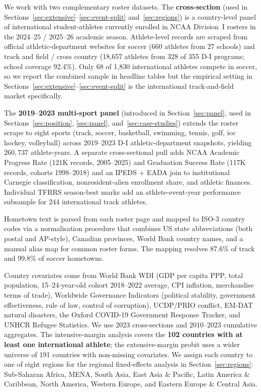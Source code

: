 \documentclass[11pt]{article}
\begin{document}
We work with two complementary roster datasets. The
\textbf{cross-section} (used in
Sections~\ref{sec:extensive}--\ref{sec:event-split}
and~\ref{sec:regions}) is a country-level
panel of international student-athletes currently enrolled in NCAA
Division~I rosters in the 2024--25 / 2025--26 academic season.
Athlete-level records are scraped from official athletic-department
websites for soccer (660 athletes from 27 schools) and track and
field / cross country (18{,}657 athletes from 328 of 355 D-I
programs; school coverage 92.4\%). Only 68 of 1{,}830 international
athletes compete in soccer, so we report the combined sample in
headline tables but the empirical setting in
Sections~\ref{sec:extensive}--\ref{sec:event-split}
is the international track-and-field market
specifically.

The \textbf{2019--2023 multi-sport panel} (introduced in
Section~\ref{sec:panel}, used in
Sections~\ref{sec:position}, \ref{sec:panel}, and~\ref{sec:case-studies})
extends the roster scrape to eight sports (track, soccer, basketball, swimming,
tennis, golf, ice hockey, volleyball) across 2019--2023 D-I
athletic-department snapshots, yielding $260{,}737$ athlete-years.
A separate cross-sectional pull adds NCAA Academic Progress Rate
(121K records, 2005--2025) and Graduation Success Rate (117K
records, cohorts 1998--2018) and an IPEDS + EADA join to
institutional Carnegie classification, nonresident-alien enrollment
share, and athletic finances. Individual TFRRS season-best marks
add an athlete-event-year performance subsample for 244
international track athletes.

Hometown text is parsed from each roster page and mapped to ISO-3
country codes via a normalisation procedure that combines US state
abbreviations (both postal and AP-style), Canadian provinces, World
Bank country names, and a manual alias map for common roster forms.
The mapping resolves 87.6\% of track and 99.8\% of soccer hometowns.

Country covariates come from World Bank WDI (GDP per capita PPP,
total population, 15--24-year-old cohort 2018--2022 average, CPI
inflation, merchandise terms of trade), Worldwide Governance
Indicators (political stability, government effectiveness, rule of
law, control of corruption), UCDP/PRIO conflict, EM-DAT natural
disasters, the Oxford COVID-19 Government Response Tracker, and
UNHCR Refugee Statistics. We use 2023 cross-sections and 2010--2023
cumulative aggregates. The intensive-margin analysis covers the
\textbf{102 countries with at least one international athlete}; the
extensive-margin probit uses a wider universe of 191 countries with
non-missing covariates. We assign each country to one of eight
regions for the regional fixed-effects analysis in
Section~\ref{sec:regions}: Sub-Saharan Africa, MENA, South Asia,
East Asia \& Pacific, Latin America \& Caribbean, North America,
Western Europe, and Eastern Europe \& Central Asia.
\end{document}
